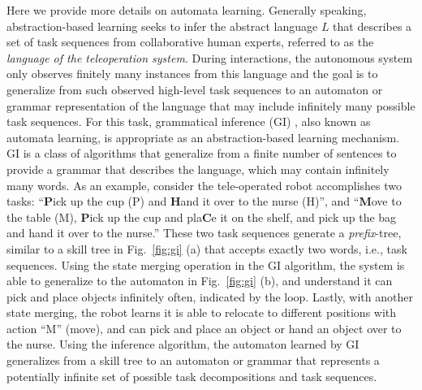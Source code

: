 \documentclass[letterpaper, 11 pt, onecolumn]{article}
\begin{document}
Here we provide more details on automata learning. Generally speaking, abstraction-based learning seeks to infer the abstract language $L$ that describes  a set of task sequences from collaborative human experts, referred to as the \emph{language of the teleoperation system}. During interactions, the autonomous system only observes finitely many instances from this language and the goal is to generalize from such observed high-level task sequences to an automaton or grammar representation of the language that may include infinitely many possible task sequences. For this task, grammatical inference (GI) \cite{de2010grammatical}, also known as automata learning, is appropriate as an abstraction-based learning mechanism. GI is a class of algorithms that generalize from a finite number of sentences to provide a grammar that describes the language, which may contain infinitely many words. As an example, consider the tele-operated robot accomplishes two tasks:  ``\textbf{P}ick up the cup (P) and \textbf{H}and it over to the nurse (H)'', and 
``\textbf{M}ove to the table (M), \textbf{P}ick up the cup and pla\textbf{C}e it on the shelf, and pick up the bag and hand it over to the nurse.'' These two task sequences generate a \emph{prefix}-tree, similar to a skill tree \cite{konidaris2018skills} in Fig.~\ref{fig:gi} (a) that accepts exactly two words, i.e., task sequences. Using the state merging operation \cite{de2010grammatical} in the GI algorithm, the system is able to generalize to the automaton in Fig.~\ref{fig:gi} (b), and understand it can pick and place objects infinitely often, indicated by the loop. Lastly, with another state merging, the robot learns it is able to relocate to different positions with action ``M'' (move), and can pick and place an object or hand an object over to the nurse. Using the inference algorithm, the automaton learned by GI generalizes from a skill tree to an automaton or grammar that represents a potentially infinite set of possible task decompositions and task sequences.
\end{document}
